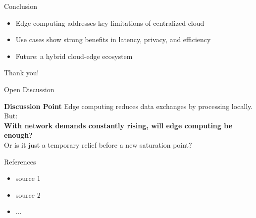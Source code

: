 \documentclass{beamer}
\begin{document}
\begin{frame}{Conclusion}
    \begin{itemize}
      \item Edge computing addresses key limitations of centralized cloud
      \item Use cases show strong benefits in latency, privacy, and efficiency
      \item Future: a hybrid cloud-edge ecosystem
    \end{itemize}
    \vspace{0.3cm}
    Thank you!
  \end{frame}

\begin{frame}{Open Discussion}
  \begin{block}{\textbf{Discussion Point}}
    Edge computing reduces data exchanges by processing locally. But:\\
    \textbf{With network demands constantly rising, will edge computing be enough?}\\
    Or is it just a temporary relief before a new saturation point?
  \end{block}
\end{frame}

\begin{frame}{References}
    \begin{itemize}
        \item source 1
        \item source 2
        \item ...
      \end{itemize}
    \note{

    }
\end{frame}
\end{document}
